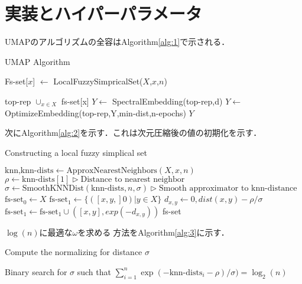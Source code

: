 \documentclass{jsarticle}
\begin{document}
\section{実装とハイパーパラメータ}
UMAPのアルゴリズムの全容はAlgorithm\ref{alg:1}で示される．
\begin{algorithm}
  \caption{UMAP Algorithm}
  \label{alg:1}
  \begin{algorithmic}

      \State Fs-set[$x$] $\leftarrow$ LocalFuzzySimpricalSet($X$,$x$,$n$)

      \EndFor
    \State top-rep \leftarrow $\cup_{x \in X}$ fs-set[x]
    \State $Y \leftarrow$ SpectralEmbedding(top-rep,d)
    \State $Y \leftarrow$ OptimizeEmbedding(top-rep,Y,min-dist,n-epochs)
    \State \Return $Y$
    \EndFunction
  \end{algorithmic}
\end{algorithm}

次にAlgorithm\ref{alg:2}を示す．これは次元圧縮後の値の初期化を示す．
\begin{algorithm}
  \caption{Constructing a local fuzzy simplical set}
  \label{alg:2}
  \begin{algorithmic}
      \State $\text{knn,knn-dists} \leftarrow \text{ApproxNearestNeighbors}(X,x,n)$
      \State $\rho \leftarrow \text{knn-dists}[1] \rhd \text{Distance to nearest neighbor}$ 
      \State $\sigma \leftarrow \text{SmoothKNNDist}(\text{knn-dists},n,\sigma) \rhd \text{Smooth approximator to knn-distance}$
      \State $\text{fs-set}_0 \leftarrow X$
      \State $\text{fs-set}_1 \leftarrow \{([x,y,]0) | y \in X \}$
        \State $d_{x,y} \leftarrow{0,dist(x,y)-\rho}/\sigma$
        \State $\text{fs-set}_1 \leftarrow \text{fs-set}_1 \cup ([x,y],exp(-d_{x,y}))$ 
      \EndFor
      \State \Return fs-set
  \end{algorithmic}
\end{algorithm}

$\log(n)$に最適な$\omega$を求める方法をAlgorithm\ref{alg:3}に示す．
\begin{algorithm}
  \caption{Compute the normalizing for distance $\sigma$}
  \label{alg:3}
  \begin{algorithmic}
    \State Binary search for $\sigma$ such that $\sum_{i=1}^n \exp (-\text{knn-dists}_i - \rho)/\sigma)=\log_2(n)$
    \State \Return \sigma
  \end{algorithmic}
\end{algorithm}
\end{document}
